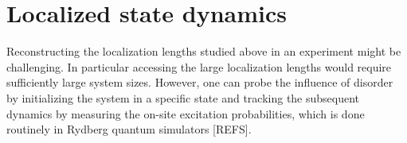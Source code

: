 \documentclass[prl,aps,twocolumn,showpacs,superscriptaddress,longbibliography]{revtex4-1}
\begin{document}
















%
\section{Localized state dynamics}

Reconstructing the localization lengths studied above in an experiment might be challenging. In particular accessing the large localization lengths would require sufficiently large system sizes. However, one can probe the influence of disorder by initializing the system in a specific state and tracking the subsequent dynamics by measuring the on-site excitation probabilities, which is done routinely in Rydberg quantum simulators [REFS].
\end{document}
